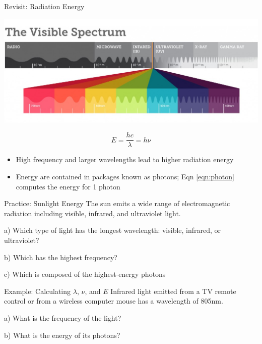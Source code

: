 \documentclass[11pt]{beamer}
\begin{document}
\begin{frame}{Revisit: Radiation Energy}
  \begin{center}
    \includegraphics[width=0.85\linewidth]{visible_light}
  \end{center}
  \begin{equation}
    E = \frac{hc}{\lambda} = h\nu
    \label{eqn:photon}
  \end{equation}
  \begin{itemize}
  \item High frequency and larger wavelengths lead to higher radiation
    energy
  \item Energy are contained in packages known as photons; Eqn \ref{eqn:photon}
    computes the energy for 1 photon
  \end{itemize}
\end{frame}

\begin{frame}{Practice: Sunlight Energy}
  The sun emits a wide range of electromagnetic radiation including
  visible, infrared, and ultraviolet light.

  a) Which type of light has the longest wavelength: visible, infrared,
  or ultraviolet?

  b) Which has the highest frequency?

  c) Which is composed of the highest-energy photons
  \vfill
\end{frame}

\begin{frame}{Example: Calculating $\lambda$, $\nu$, and $E$}
  Infrared light emitted from a TV remote control or from a wireless
  computer mouse has a wavelength of 805nm.

  a) What is the frequency of the light?

  b) What is the energy of its photons?

\end{frame}
\end{document}
